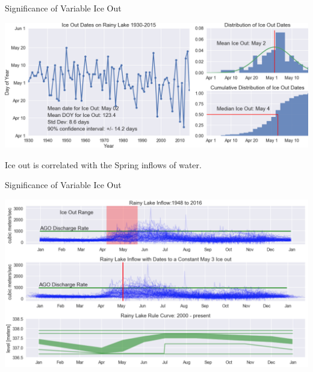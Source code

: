 \documentclass[compress,english]{beamer}
\begin{document}
\begin{frame}{Significance of Variable Ice Out}

\begin{center}
\includegraphics[width=0.8\paperwidth]{IceOutData.png}
\end{center}

Ice out is correlated with the Spring inflows of water.

\end{frame}

\begin{frame}{Significance of Variable Ice Out}

\begin{center}
\includegraphics[width=0.8\paperwidth]{IceOutInflow2.png}
\end{center}

\end{frame}
\end{document}
